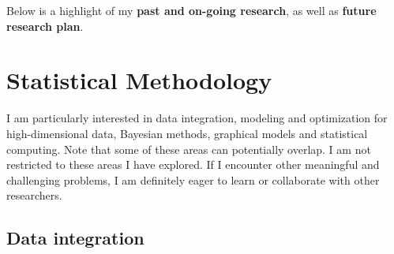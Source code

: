 \documentclass[a4paper, 10pt]{article}
\begin{document}
Below is a highlight of my \textbf{past and on-going research}, as well as \textbf{future research plan}.

\section{Statistical Methodology}
I am particularly interested in data integration, modeling and optimization for high-dimensional data, Bayesian methods, graphical models and statistical computing.
Note that some of these areas can potentially overlap.
I am not restricted to these areas I have explored.
If I encounter other meaningful and challenging problems,
I am definitely eager to learn or collaborate with other researchers.

\subsection{Data integration}
\end{document}
